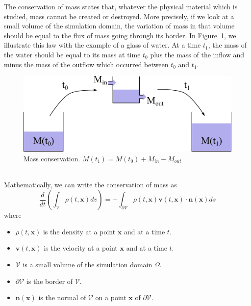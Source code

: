 The conservation of mass states that, whatever the physical material which is studied, mass cannot be created or destroyed.
More precisely, if we look at a small volume of the simulation domain, the variation of mass in that volume should be equal to the flux of mass going through its border.
In Figure~\ref{fig:massConservation}, we illustrate this law with the example of a glass of water.
At a time $t_{1}$, the mass of the water should be equal to its mass at time $t_{0}$ plus the mass of the inflow and minus the mass of the outflow which occurred between $t_{0}$ and $t_{1}$.
\begin{figure}[!h]
	\centering
	\includegraphics[width=\linewidth]{images/continuum_mechanics/massConservation.png}
	\caption[STAR mechanics: Mass conservation]{\label{fig:massConservation} Mass conservation. $M(t_{1}) = M(t_{0}) + M_{in} - M_{out}$}
\end{figure}
\\
Mathematically, we can write the conservation of mass as
\begin{equation}
    \label{eq:massConservation}
    \displaystyle 
    \frac{d}{dt}\left( \int_{\mathcal{V}} \rho(t,\mathbf{x}) dv \right)
    =
    - \int_{\mathcal{\partial V}}\rho(t,\mathbf{x})\mathbf{v}(t,\mathbf{x}) \cdot \mathbf{n}(\mathbf{x}) ds
\end{equation}
where
\begin{itemize}
	\item $\rho(t,\mathbf{x})$ is the density at a point $\mathbf{x}$ and at a time $t$.
	\item $\mathbf{v}(t,\mathbf{x})$ is the velocity at a point $\mathbf{x}$ and at a time $t$.
	\item $\mathcal{V}$ is a small volume of the simulation domain $\Omega$.
	\item $\mathcal{\partial V}$ is the border of $\mathcal{V}$.
	\item $\mathbf{n}(\mathbf{x})$ is the normal of $\mathcal{V}$ on a point $\mathbf{x}$ of $\partial\mathcal{V}$.
\end{itemize}
